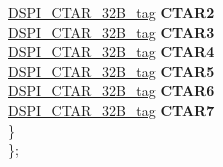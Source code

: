 \begin{DoxyCompactItemize}
\begin{tabbing}
\>\>\mbox{\hyperlink{unionDSPI__CTAR__tag}{DSPI\_CTAR\_32B\_tag}} {\bfseries CTAR2}\\
\>\>\mbox{\hyperlink{unionDSPI__CTAR__tag}{DSPI\_CTAR\_32B\_tag}} {\bfseries CTAR3}\\
\>\>\mbox{\hyperlink{unionDSPI__CTAR__tag}{DSPI\_CTAR\_32B\_tag}} {\bfseries CTAR4}\\
\>\>\mbox{\hyperlink{unionDSPI__CTAR__tag}{DSPI\_CTAR\_32B\_tag}} {\bfseries CTAR5}\\
\>\>\mbox{\hyperlink{unionDSPI__CTAR__tag}{DSPI\_CTAR\_32B\_tag}} {\bfseries CTAR6}\\
\>\>\mbox{\hyperlink{unionDSPI__CTAR__tag}{DSPI\_CTAR\_32B\_tag}} {\bfseries CTAR7}\\
\>\} \\
\}; \\


\end{tabbing}
\end{DoxyCompactItemize}
